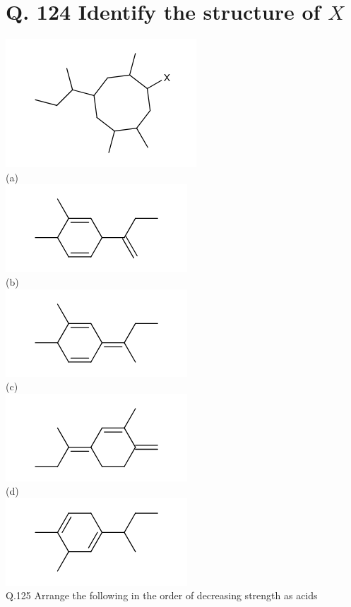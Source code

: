 \documentclass[10pt]{article}
\begin{document}
\section*{Q. 124 Identify the structure of $X$}
\includegraphics{smile-b0ad0460559e26a900fdcceed59587802a62ea77}\\
(a)\\
\includegraphics{smile-cfa6bd441af618634813b16a70bcf88c15d49831}\\
(b)\\
\includegraphics{smile-f265ea353deb669d08298120f00f64075de6e38e}\\
(c)\\
\includegraphics{smile-d71cddf00c5ce28f2c736f407d25beb25d21efaf}\\
(d)\\
\includegraphics{smile-8388ec5fd370097a59738c661a2ab590488ad275}\\
Q.125 Arrange the following in the order of decreasing strength as acids
\end{document}
